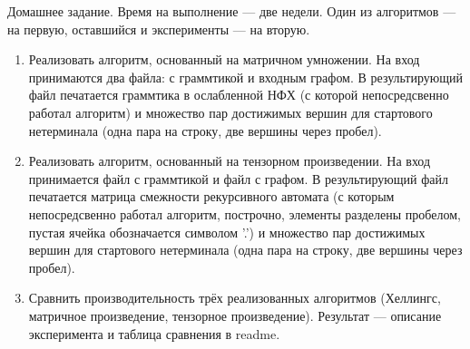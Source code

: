 Домашнее задание. Время на выполнение --- две недели. Один из алгоритмов --- на первую, оставшийся и эксперименты --- на вторую.
\begin{enumerate}
    \item Реализовать алгоритм, основанный на матричном умножении. На вход принимаются два файла: с граммтикой и входным графом. В результирующий файл печатается граммтика в ослабленной НФХ (с которой непосредсвенно работал алгоритм) и множество пар достижимых вершин для стартового нетерминала (одна пара на строку, две вершины через пробел).
    \item Реализовать алгоритм, основанный на тензорном произведении. На вход принимается файл с граммтикой и файл с графом. В результирующий файл печатается матрица смежности рекурсивного автомата (с которым непосредсвенно работал алгоритм, построчно, элементы разделены пробелом, пустая ячейка обозначается символом '.') и множество пар достижимых вершин для стартового нетерминала (одна пара на строку, две вершины через пробел).
    \item Сравнить производительность трёх реализованных алгоритмов (Хеллингс, матричное произведение, тензорное произведение). Результат --- описание эксперимента и таблица сравнения в readme.
\end{enumerate}
